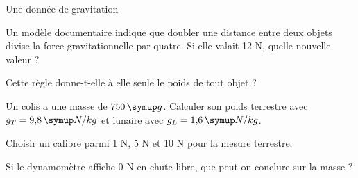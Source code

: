 \par\noindent\begin{minipage}{\linewidth}
\begin{exercice}[3]{Une donnée de gravitation}
\begin{questions}
\item Un modèle documentaire indique que doubler une distance entre deux objets divise la force gravitationnelle par quatre. Si elle valait 12 N, quelle nouvelle valeur ?
\item Cette règle donne-t-elle à elle seule le poids de tout objet ?
\end{questions}
\end{exercice}
\end{minipage}
\label{defi-ex-11}
\begin{questions}
\item Un colis a une masse de $750\unite g$. Calculer son poids terrestre avec $g_T=9{,}8\unite{N/kg}$ et lunaire avec $g_L=1{,}6\unite{N/kg}$.
\item Choisir un calibre parmi 1 N, 5 N et 10 N pour la mesure terrestre.
\item Si le dynamomètre affiche 0 N en chute libre, que peut-on conclure sur la masse ?
\end{questions}
\pcGrille
